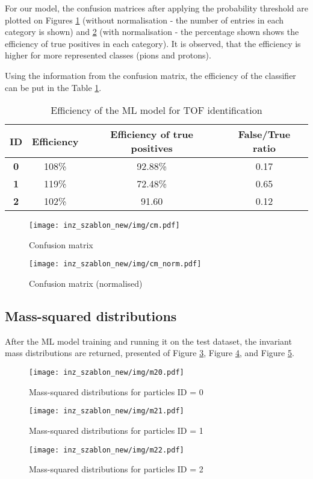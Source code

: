 For our model, the confusion matrices after applying the probability threshold are plotted on Figures \ref{cm} (without normalisation - the number of entries in each category is shown) and \ref{cm_norm} (with normalisation - the percentage shown shows the efficiency of true positives in each category). It is observed, that the efficiency is higher for more represented classes (pions and protons).

Using the information from the confusion matrix, the efficiency of the classifier can be put in the Table \ref{tab:tof}.

\begin{table}[H]
    \begin{tabular}{|c|c|c|c|}
    \hline
    \textbf{ID} & \textbf{Efficiency} & \textbf{Efficiency of true positives} & \textbf{False/True ratio} \\ \hline
    \textbf{0} & 108\% & 92.88\% & 0.17 \\ \hline
    \textbf{1} & 119\% & 72.48\% & 0.65 \\ \hline
    \textbf{2} & 102\% & 91.60   & 0.12 \\ \hline
    \end{tabular}
\caption{\label{tab:tof}Efficiency of the ML model for TOF identification}
\end{table}

\begin{figure}[H]
    \centering
    \texttt{[image: inz\_szablon\_new/img/cm.pdf]}
    \caption{Confusion matrix}
    \label{cm}
\end{figure}
\begin{figure}[H]
    \centering
    \texttt{[image: inz\_szablon\_new/img/cm\_norm.pdf]}
    \caption{Confusion matrix (normalised)}
    \label{cm_norm}
\end{figure}

\subsection{Mass-squared distributions}
After the ML model training and running it on the test dataset, the  invariant mass distributions are returned, presented of Figure \ref{mass distr id0}, Figure \ref{mass distr id1}, and Figure \ref{mass distr id2}.

\begin{figure}[h!]
    \centering
    \texttt{[image: inz\_szablon\_new/img/m20.pdf]}
    \caption{Mass-squared distributions for particles ID = 0}
    \label{mass distr id0}
\end{figure}
\begin{figure}[h!]
    \centering
    \texttt{[image: inz\_szablon\_new/img/m21.pdf]}
    \caption{Mass-squared distributions for particles ID = 1}
     \label{mass distr id1}
\end{figure}
\begin{figure}[h!]
    \centering
    \texttt{[image: inz\_szablon\_new/img/m22.pdf]}
    \caption{Mass-squared distributions for particles ID = 2}
     \label{mass distr id2}
\end{figure}

